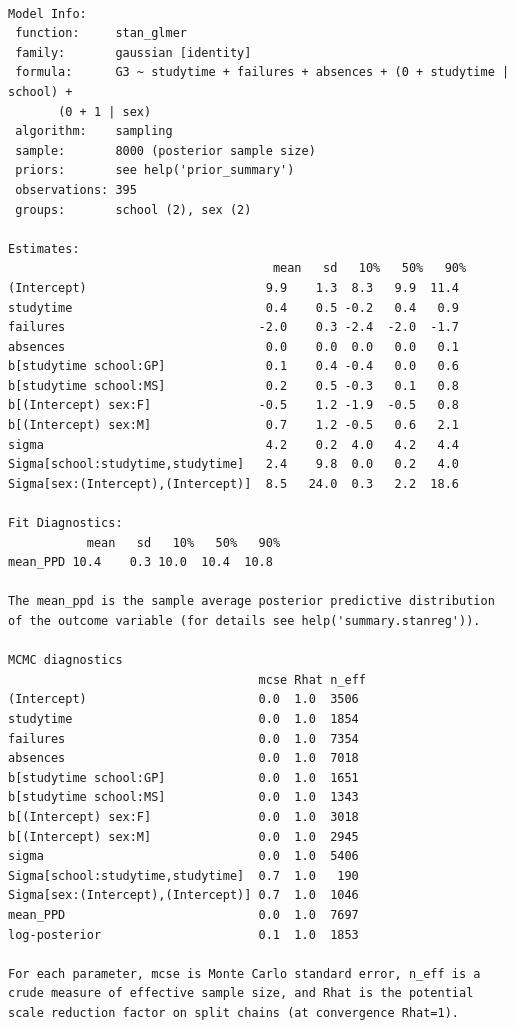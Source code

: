 \documentclass[
  10pt,
]{article}
\begin{document}
\begin{verbatim}

Model Info:
 function:     stan_glmer
 family:       gaussian [identity]
 formula:      G3 ~ studytime + failures + absences + (0 + studytime | school) + 
       (0 + 1 | sex)
 algorithm:    sampling
 sample:       8000 (posterior sample size)
 priors:       see help('prior_summary')
 observations: 395
 groups:       school (2), sex (2)

Estimates:
                                     mean   sd   10%   50%   90%
(Intercept)                         9.9    1.3  8.3   9.9  11.4 
studytime                           0.4    0.5 -0.2   0.4   0.9 
failures                           -2.0    0.3 -2.4  -2.0  -1.7 
absences                            0.0    0.0  0.0   0.0   0.1 
b[studytime school:GP]              0.1    0.4 -0.4   0.0   0.6 
b[studytime school:MS]              0.2    0.5 -0.3   0.1   0.8 
b[(Intercept) sex:F]               -0.5    1.2 -1.9  -0.5   0.8 
b[(Intercept) sex:M]                0.7    1.2 -0.5   0.6   2.1 
sigma                               4.2    0.2  4.0   4.2   4.4 
Sigma[school:studytime,studytime]   2.4    9.8  0.0   0.2   4.0 
Sigma[sex:(Intercept),(Intercept)]  8.5   24.0  0.3   2.2  18.6 

Fit Diagnostics:
           mean   sd   10%   50%   90%
mean_PPD 10.4    0.3 10.0  10.4  10.8 

The mean_ppd is the sample average posterior predictive distribution of the outcome variable (for details see help('summary.stanreg')).

MCMC diagnostics
                                   mcse Rhat n_eff
(Intercept)                        0.0  1.0  3506 
studytime                          0.0  1.0  1854 
failures                           0.0  1.0  7354 
absences                           0.0  1.0  7018 
b[studytime school:GP]             0.0  1.0  1651 
b[studytime school:MS]             0.0  1.0  1343 
b[(Intercept) sex:F]               0.0  1.0  3018 
b[(Intercept) sex:M]               0.0  1.0  2945 
sigma                              0.0  1.0  5406 
Sigma[school:studytime,studytime]  0.7  1.0   190 
Sigma[sex:(Intercept),(Intercept)] 0.7  1.0  1046 
mean_PPD                           0.0  1.0  7697 
log-posterior                      0.1  1.0  1853 

For each parameter, mcse is Monte Carlo standard error, n_eff is a crude measure of effective sample size, and Rhat is the potential scale reduction factor on split chains (at convergence Rhat=1).
\end{verbatim}
\end{document}
